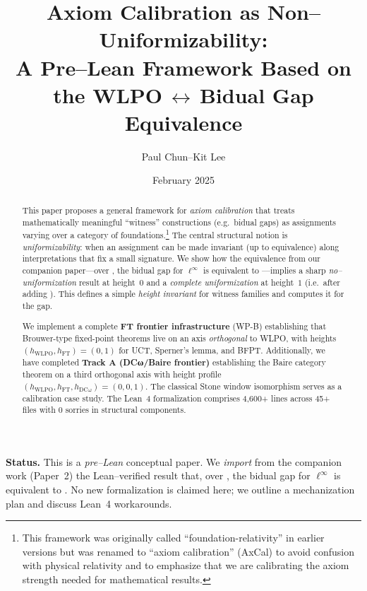\documentclass[11pt]{article}
\title{Axiom Calibration as Non--Uniformizability:\\
A Pre--Lean Framework Based on the WLPO\,$\boldsymbol{\leftrightarrow}$\,Bidual Gap Equivalence}
\author{Paul Chun--Kit Lee}
\date{February 2025}
\theoremstyle{definition}
\theoremstyle{remark}
\newcommand{\linf}{\ell^\infty}
\newcommand{\WLPO}{\mathrm{WLPO}}
\newcommand{\BISH}{\mathrm{BISH}}
\begin{document}
\maketitle

\begin{abstract}
This paper proposes a general framework for \emph{axiom calibration} that treats mathematically meaningful ``witness'' constructions (e.g.\ bidual gaps) as assignments varying over a category of foundations.\footnote{This framework was originally called ``foundation-relativity'' in earlier versions but was renamed to ``axiom calibration'' (AxCal) to avoid confusion with physical relativity and to emphasize that we are calibrating the axiom strength needed for mathematical results.} The central structural notion is \emph{uniformizability}: when an assignment can be made invariant (up to equivalence) along interpretations that fix a small signature. We show how the equivalence from our companion paper---over \BISH, the bidual gap for $\linf$ is equivalent to \WLPO---implies a sharp \emph{no--uniformization} result at height~$0$ and a \emph{complete uniformization} at height~$1$ (i.e.\ after adding \WLPO). This defines a simple \emph{height invariant} for witness families and computes it for the gap.

We implement a complete \textbf{FT frontier infrastructure} (WP-B) establishing that Brouwer-type fixed-point theorems live on an axis \emph{orthogonal} to WLPO, with heights $(h_{\text{WLPO}}, h_{\text{FT}}) = (0, 1)$ for UCT, Sperner's lemma, and BFPT. Additionally, we have completed \textbf{Track A (DCω/Baire frontier)} establishing the Baire category theorem on a third orthogonal axis with height profile $(h_{\text{WLPO}}, h_{\text{FT}}, h_{\text{DCω}}) = (0, 0, 1)$. The classical Stone window isomorphism serves as a calibration case study. The Lean~4 formalization comprises 4,600+ lines across 45+ files with 0 sorries in structural components.
\end{abstract}

\begin{mdframed}[style=status]
\textbf{Status.} This is a \emph{pre--Lean} conceptual paper. We \emph{import} from the companion work (Paper~2) the Lean--verified result that, over \BISH, the bidual gap for $\linf$ is equivalent to \WLPO. No new formalization is claimed here; we outline a mechanization plan and discuss Lean~4 workarounds.
\end{mdframed}

\tableofcontents
\end{document}
